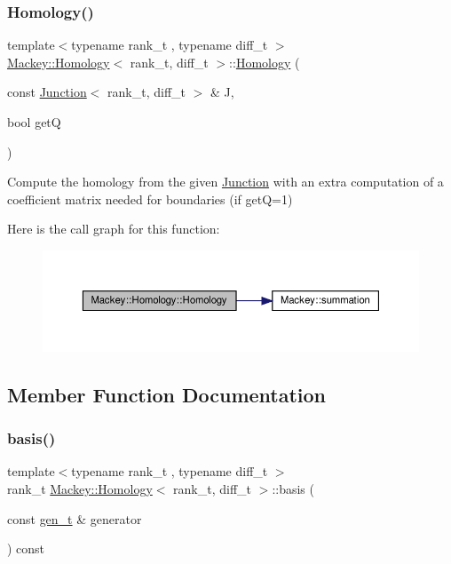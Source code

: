 \subsubsection{\texorpdfstring{Homology()}{Homology()}\hspace{0.1cm}{\footnotesize\ttfamily [3/3]}}
{\footnotesize\ttfamily template$<$typename rank\+\_\+t , typename diff\+\_\+t $>$ \\
\hyperlink{classMackey_1_1Homology}{Mackey\+::\+Homology}$<$ rank\+\_\+t, diff\+\_\+t $>$\+::\hyperlink{classMackey_1_1Homology}{Homology} (\begin{DoxyParamCaption}\item[{const \hyperlink{classMackey_1_1Junction}{Junction}$<$ rank\+\_\+t, diff\+\_\+t $>$ \&}]{J,  }\item[{bool}]{getQ }\end{DoxyParamCaption})}



Compute the homology from the given \hyperlink{classMackey_1_1Junction}{Junction} with an extra computation of a coefficient matrix needed for boundaries (if getQ=1) 

Here is the call graph for this function\+:\nopagebreak
\begin{figure}[H]
\begin{center}
\leavevmode
\includegraphics[width=350pt]{classMackey_1_1Homology_af42f480509ef68df47308c0f506d44c8_cgraph}
\end{center}
\end{figure}


\subsection{Member Function Documentation}
\mbox{\label{classMackey_1_1Homology_a2e6fb6da3abdba934a1eb2f4236623cb}} 
\subsubsection{\texorpdfstring{basis()}{basis()}}
{\footnotesize\ttfamily template$<$typename rank\+\_\+t , typename diff\+\_\+t $>$ \\
rank\+\_\+t \hyperlink{classMackey_1_1Homology}{Mackey\+::\+Homology}$<$ rank\+\_\+t, diff\+\_\+t $>$\+::basis (\begin{DoxyParamCaption}\item[{const \hyperlink{classMackey_1_1Homology_adf81f4293a5feba94aa734fcc8c89a46}{gen\+\_\+t} \&}]{generator }\end{DoxyParamCaption}) const}



